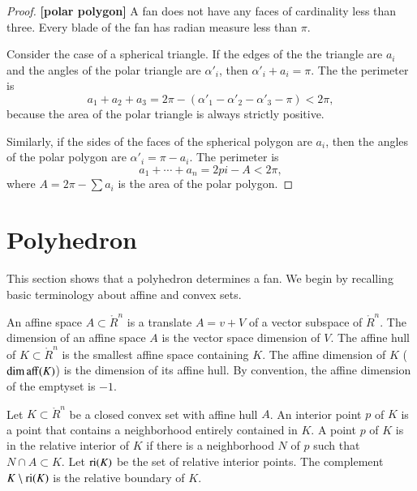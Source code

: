 {{\begin{proof} {\bf [polar polygon]} A fan does not have any faces of cardinality less than three.
Every blade of the fan has radian measure less than $\pi$.  

Consider the case of a spherical triangle.  If the edges of the
the triangle are $a_i$ and the angles of the polar
triangle are $\alpha'_i$, then $\alpha'_i+a_i=\pi$.
The the perimeter is 
$$a_1+a_2+a_3 = 2\pi - (\alpha'_1 -\alpha'_2 - \alpha'_3-\pi) < 2\pi,$$
because the area of the polar triangle is always strictly positive.

Similarly, if the sides of the faces of the spherical polygon are
$a_i$, then the angles of the polar polygon are $\alpha'_i = \pi-a_i$.
The perimeter is
$$
a_1+\cdots+a_n  = 2pi- A< 2\pi,
$$
where $A = 2\pi-\sum a_i$ is the area of the polar polygon.
\end{proof}



\section{Polyhedron}

This section shows that a polyhedron determines a fan.  We begin by recalling basic terminology about affine and convex sets.


An affine space $A\subset\ring{R}^n$ is a translate $A=v + V$ of
a vector subspace of $\ring{R}^n$.  The dimension of an affine space $A$
is the vector space dimension of $V$.  The
affine hull of $K\subset\ring{R}^n$ is the smallest affine space containing $K$.  The affine dimension of $K$ ($\operatorname{dim\,aff}(K)$) is the dimension of its affine hull.  By convention, the affine dimension of the emptyset is $-1$.

\begin{definition} Let $K\subset\ring{R}^n$ be a closed convex set with affine hull $A$.   An interior point $p$ of $K$ is a point that contains a neighborhood entirely contained in $K$.  A point $p$ of $K$ is in the relative interior of $K$ if there is a neighborhood $N$ of $p$ such that $N\cap A\subset K$.  Let ${\operatorname{ri}}(K)$ be the set of relative interior points.  The complement $K\setminus {\operatorname{ri}}(K)$ is the relative boundary of $K$.
\end{definition}

}}
